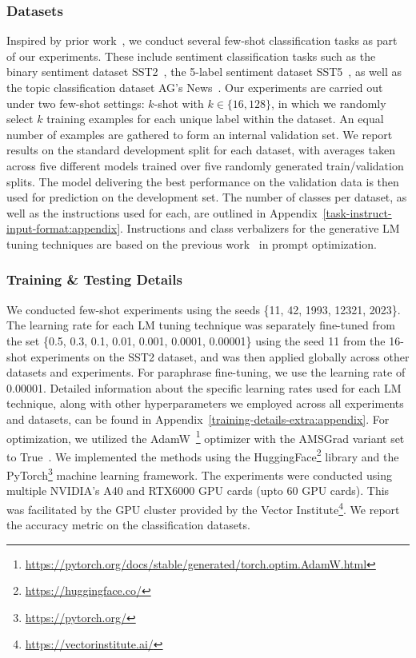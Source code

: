 \documentclass[11pt]{article}
\begin{document}
\subsubsection{Datasets}
Inspired by prior work~\cite{gao-etal-2021-making, deng-etal-2022-rlprompt}, we conduct several few-shot classification tasks as part of our experiments. These include sentiment classification tasks such as the binary sentiment dataset SST2~\cite{socher-etal-2013-recursive}, the 5-label sentiment dataset SST5~\cite{socher-etal-2013-recursive}, as well as the topic classification dataset AG's News~\cite{NIPS2015_250cf8b5}. Our experiments are carried out under two few-shot settings: $k$-shot with $k \in \{16, 128\}$, in which we randomly select $k$ training examples for each unique label within the dataset. An equal number of examples are gathered to form an internal validation set. We report results on the standard development split for each dataset, with averages taken across five different models trained over five randomly generated train/validation splits. The model delivering the best performance on the validation data is then used for prediction on the development set. The number of classes per dataset, as well as the instructions used for each, are outlined in Appendix~\ref{task-instruct-input-format:appendix}. Instructions and class verbalizers for the generative LM tuning techniques are based on the previous work~\cite{deng-etal-2022-rlprompt} in prompt optimization.
\subsubsection{Training \& Testing Details}
We conducted few-shot experiments using the seeds \{11, 42, 1993, 12321, 2023\}. The learning rate for each LM tuning technique was separately fine-tuned from the set \{0.5, 0.3, 0.1, 0.01, 0.001, 0.0001, 0.00001\} using the seed 11 from the 16-shot experiments on the SST2 dataset, and was then applied globally across other datasets and experiments. For paraphrase fine-tuning, we use the learning rate of 0.00001. Detailed information about the specific learning rates used for each LM technique, along with other hyperparameters we employed across all experiments and datasets, can be found in Appendix~\ref{training-details-extra:appendix}. For optimization, we utilized the AdamW~\cite{DBLP:journals/corr/abs-1711-05101}\footnote{\url{https://pytorch.org/docs/stable/generated/torch.optim.AdamW.html}} optimizer with the AMSGrad variant set to True~\cite{DBLP:journals/corr/abs-1904-09237}. We implemented the methods using the HuggingFace\footnote{\url{https://huggingface.co/}} library and the PyTorch\footnote{\url{https://pytorch.org/}} machine learning framework. The experiments were conducted using multiple NVIDIA's A40 and RTX6000 GPU cards (upto 60 GPU cards). This was facilitated by the GPU cluster provided by the Vector Institute\footnote{\url{https://vectorinstitute.ai/}}. We report the accuracy metric on the classification datasets.
\end{document}
